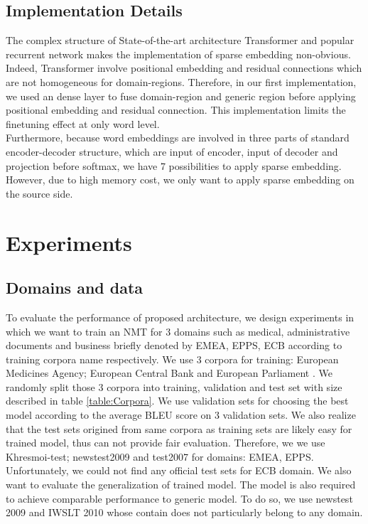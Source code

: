 \documentclass[11pt,a4paper]{article}
\newcommand{\fyTodo}[1]{\Todo[FY:]{\textcolor{orange}{#1}}}
\begin{document}
\subsection{Implementation Details}
The complex structure of State-of-the-art architecture Transformer \cite{Vaswani17attention} and popular recurrent network \cite{bahdanau2014neural} makes the implementation of sparse embedding non-obvious. Indeed, Transformer involve positional embedding and residual connections which are not homogeneous for domain-regions. Therefore, in our first implementation, we used an dense layer to fuse domain-region and generic region before applying positional embedding and residual connection. This implementation limits the finetuning effect at only word level.\\
Furthermore, because word embeddings are involved in three parts of standard encoder-decoder structure, which are input of encoder, input of decoder and projection before softmax, we have 7 possibilities to apply sparse embedding. However, due to high memory cost, we only want to apply sparse embedding on the source side. \fyTodo{Explain this. Future work ?}

\section{Experiments \label{sec:experiments}}

\subsection{Domains and data \label{ssec:data}}
To evaluate the performance of proposed architecture, we design experiments in which we want to train an NMT for 3 domains such as medical, administrative documents and business briefly denoted by EMEA, EPPS, ECB according to training corpora name respectively. We use 3 corpora for training: European Medicines Agency; European Central Bank and European Parliament \cite{Tiedemann2009RANLP5}. We randomly split those 3 corpora into training, validation and test set with size described in table \ref{table:Corpora}. We use validation sets for choosing the best model according to the average BLEU score on 3 validation sets. We also realize that the test sets origined from same corpora as training sets are likely easy for trained model, thus can not provide fair evaluation. Therefore, we we use Khresmoi-test; newstest2009 and test2007 for domains: EMEA, EPPS. Unfortunately, we could not find any official test sets for ECB domain. We also want to evaluate the generalization of trained model. The model is also required to achieve comparable performance to generic model. To do so, we use newstest 2009 and IWSLT 2010 whose contain does not particularly belong to any domain.\fyTodo{Clarify / simplify text}
\end{document}
